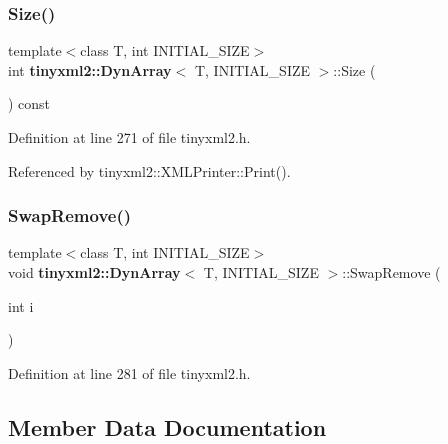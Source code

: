 \subsubsection{Size()}
{\footnotesize\ttfamily template$<$class T, int I\+N\+I\+T\+I\+A\+L\+\_\+\+S\+I\+ZE$>$ \\
int \textbf{ tinyxml2\+::\+Dyn\+Array}$<$ T, I\+N\+I\+T\+I\+A\+L\+\_\+\+S\+I\+ZE $>$\+::Size (\begin{DoxyParamCaption}{ }\end{DoxyParamCaption}) const\hspace{0.3cm}{\ttfamily [inline]}}



Definition at line 271 of file tinyxml2.\+h.



Referenced by tinyxml2\+::\+X\+M\+L\+Printer\+::\+Print().

\mbox{\label{classtinyxml2_1_1_dyn_array_aa72c644f8b5e9ec5dab5b66c88f5665f}} 
\subsubsection{SwapRemove()}
{\footnotesize\ttfamily template$<$class T, int I\+N\+I\+T\+I\+A\+L\+\_\+\+S\+I\+ZE$>$ \\
void \textbf{ tinyxml2\+::\+Dyn\+Array}$<$ T, I\+N\+I\+T\+I\+A\+L\+\_\+\+S\+I\+ZE $>$\+::Swap\+Remove (\begin{DoxyParamCaption}\item[{int}]{i }\end{DoxyParamCaption})\hspace{0.3cm}{\ttfamily [inline]}}



Definition at line 281 of file tinyxml2.\+h.



\subsection{Member Data Documentation}
\mbox{\label{classtinyxml2_1_1_dyn_array_aee2522b771ca30bc09bff4d5b3176bfc}} 
